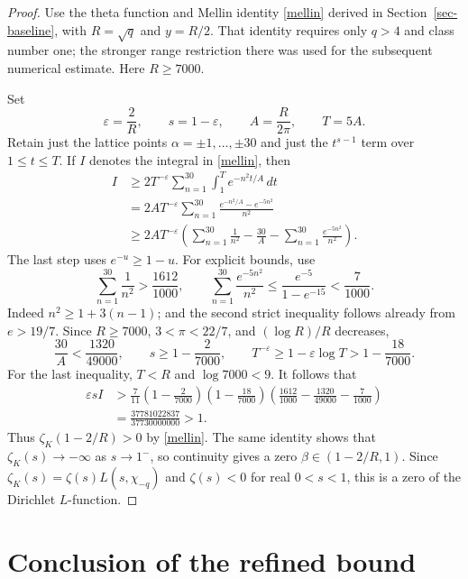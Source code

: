 \documentclass[11pt]{article}
\newcommand{\zK}{\zeta_K}
\begin{document}
\begin{proof}
Use the theta function and Mellin identity \eqref{mellin} derived
in Section~\ref{sec-baseline}, with \(R=\sqrt q\) and \(y=R/2\).
That identity requires only \(q>4\) and class number one; the stronger
range restriction there was used for the subsequent numerical estimate.
Here \(R\ge7000\).

Set
\[
 \varepsilon=\frac2R,\qquad s=1-\varepsilon,\qquad
 A=\frac{R}{2\pi},\qquad T=5A.
\]
Retain just the lattice points \(\alpha=\pm1,\ldots,\pm30\)
and just the \(t^{s-1}\) term over \(1\le t\le T\).
If \(I\) denotes the integral in \eqref{mellin}, then
\begin{align*}
 I
 &\ge 2T^{-\varepsilon}
        \sum_{n=1}^{30}\int_1^T e^{-n^2t/A}\,dt\\
 &=2A T^{-\varepsilon}
        \sum_{n=1}^{30}\frac{e^{-n^2/A}-e^{-5n^2}}{n^2}\\
 &\ge2A T^{-\varepsilon}
       \left(\sum_{n=1}^{30}\frac1{n^2}
              -\frac{30}{A}
              -\sum_{n=1}^{30}\frac{e^{-5n^2}}{n^2}\right).
\end{align*}
The last step uses \(e^{-u}\ge1-u\).
For explicit bounds, use
\[
 \sum_{n=1}^{30}\frac1{n^2}>\frac{1612}{1000},\qquad
 \sum_{n=1}^{30}\frac{e^{-5n^2}}{n^2}
 \le\frac{e^{-5}}{1-e^{-15}}<\frac7{1000}.
\]
Indeed \(n^2\ge1+3(n-1)\); and the second strict inequality follows
already from \(e>19/7\).
Since \(R\ge7000\), \(3<\pi<22/7\), and \((\log R)/R\) decreases,
\[
 \frac{30}{A}<\frac{1320}{49000},\qquad
 s\ge1-\frac2{7000},\qquad
 T^{-\varepsilon}\ge1-\varepsilon\log T
      >1-\frac{18}{7000}.
\]
For the last inequality, \(T<R\) and \(\log7000<9\).
It follows that
\begin{align*}
 \varepsilon sI
 &>
 \frac7{11}\left(1-\frac2{7000}\right)
            \left(1-\frac{18}{7000}\right)
 \left(\frac{1612}{1000}-\frac{1320}{49000}
                         -\frac7{1000}\right)\\
 &=\frac{37781022837}{37730000000}>1.
\end{align*}
Thus \(\zK(1-2/R)>0\) by \eqref{mellin}. The same identity shows
that \(\zK(s)\to-\infty\) as \(s\to1^-\), so continuity gives a
zero \(\beta\in(1-2/R,1)\).
Since \(\zK(s)=\zeta(s)L(s,\chi_{-q})\) and
\(\zeta(s)<0\) for real \(0<s<1\), this is a zero of the Dirichlet
\(L\)-function.
\end{proof}

\section{Conclusion of the refined bound}
\end{document}
